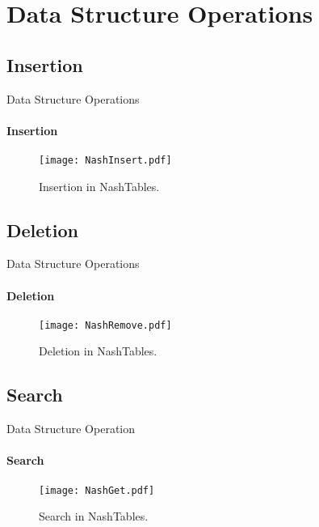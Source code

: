 \section{Data Structure Operations}
\subsection{Insertion}
\begin{frame}{Data Structure Operations}
\framesubtitle{Insertion }
\begin{figure}[H]
  \centering
  \texttt{[image: NashInsert.pdf]}
  \caption{Insertion in NashTables.}
\end{figure}
\end{frame}
\subsection{Deletion}
\begin{frame}{Data Structure Operations}
\framesubtitle{Deletion }
\begin{figure}[H]
  \centering
  \texttt{[image: NashRemove.pdf]}
  \caption{Deletion in NashTables.}
\end{figure}
\end{frame}
\subsection{Search}
\begin{frame}{Data Structure Operation}
\framesubtitle{Search }
\begin{figure}[H]
  \centering
  \texttt{[image: NashGet.pdf]}
  \caption{Search in NashTables.}
\end{figure}
\end{frame}